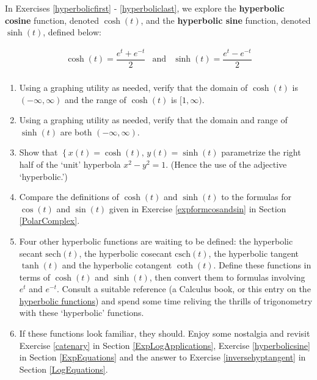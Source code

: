 \label{hyperboliccosinesine} 

In Exercises \ref{hyperbolicfirst} - \ref{hyperboliclast}, we explore the  \textbf{hyperbolic cosine} function, denoted $\cosh(t)$, and the \textbf{hyperbolic sine}
function, denoted $\sinh(t)$, defined below:

\[ \begin{array}{ccc}

\cosh(t) = \dfrac{e^{t} + e^{-t}}{2} & 
\text{and} & \sinh(t) = \dfrac{e^{t} - e^{-t}}{2} \\

\end{array} \]

\begin{enumerate}
\setcounter{enumi}{\value{HW}}

\item  Using a graphing utility as needed, verify that the domain of $\cosh(t)$ is $(-\infty, \infty)$ and the range of $\cosh(t)$ is $[1,\infty)$. \label{hyperbolicfirst}

\item  Using a graphing utility as needed, verify that the domain and range  of $\sinh(t)$ are both $(-\infty, \infty)$.

\item  Show that $\left\{ x(t) = \cosh(t), \, y(t) = \sinh(t) \right.$ parametrize the right half of the `unit' hyperbola $x^2 - y^2 = 1$.  (Hence the use of the adjective `hyperbolic.')

\item  Compare the definitions of $\cosh(t)$ and $\sinh(t)$ to the formulas for $\cos(t)$ and $\sin(t)$ given in Exercise \ref{expformcosandsin} in Section \ref{PolarComplex}.

\item \label{andtheresthyperbolic} Four other hyperbolic functions are waiting to be defined:  the hyperbolic secant $\text{sech}(t)$, the hyperbolic cosecant $\text{csch}(t)$, the hyperbolic tangent $\tanh(t)$ and the hyperbolic cotangent $\coth(t)$.  Define these functions in terms of $\cosh(t)$ and $\sinh(t)$, then convert them to formulas involving $e^{t}$ and $e^{-t}$.  Consult a suitable reference (a Calculus book, or this entry on the \href{http://en.wikipedia.org/wiki/Hyperbolic_function}{\underline{hyperbolic functions}}) and spend some time reliving the thrills of trigonometry with these `hyperbolic' functions.

\item  If these functions look familiar, they should.  Enjoy some nostalgia and revisit Exercise \ref{catenary} in Section \ref{ExpLogApplications}, Exercise \ref{hyperbolicsine} in Section \ref{ExpEquations} and the  answer to Exercise \ref{inversehyptangent} in Section \ref{LogEquations}. \label{hyperboliclast}


\end{enumerate}

